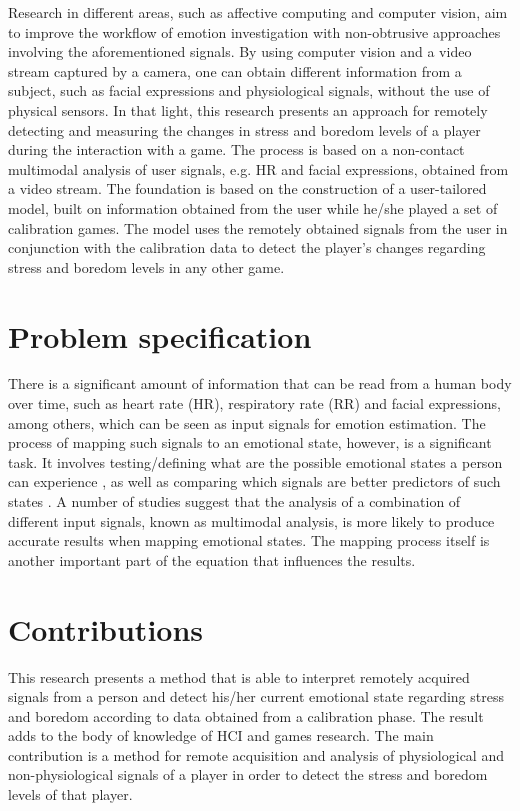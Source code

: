 Research in different areas, such as affective computing and computer vision, aim to improve the workflow of emotion investigation with non-obtrusive approaches involving the aforementioned signals. By using computer vision and a video stream captured by a camera, one can obtain different information from a subject, such as facial expressions and physiological signals, without the use of physical sensors. In that light, this research presents an approach for remotely detecting and measuring the changes in stress and boredom levels of a player during the interaction with a game. The process is based on a non-contact multimodal analysis of user signals, e.g. HR and facial expressions, obtained from a video stream. The foundation is based on the construction of a user-tailored model, built on information obtained from the user while he/she played a set of calibration games. The model uses the remotely obtained signals from the user in conjunction with the calibration data to detect the player's changes regarding stress and boredom levels in any other game.

\section{Problem specification}

There is a significant amount of information that can be read from a human body over time, such as heart rate (HR), respiratory rate (RR) and facial expressions, among others, which can be seen as input signals for emotion estimation. The process of mapping such signals to an emotional state, however, is a significant task. It involves testing/defining what are the possible emotional states a person can experience \cite{mandryk2006continuous}, as well as comparing which signals are better predictors of such states \cite{jerritta2011physiological}. A number of studies \cite{kukolja2014comparative} suggest that the analysis of a combination of different input signals, known as multimodal analysis, is more likely to produce accurate results when mapping emotional states. The mapping process itself is another important part of the equation that influences the results.

\section{Contributions}

This research presents a method that is able to interpret remotely acquired signals from a person and detect his/her current emotional state regarding stress and boredom according to data obtained from a calibration phase. The result adds to the body of knowledge of HCI and games research. The main contribution is a method for remote acquisition and analysis of physiological and non-physiological signals of a player in order to detect the stress and boredom levels of that player.

